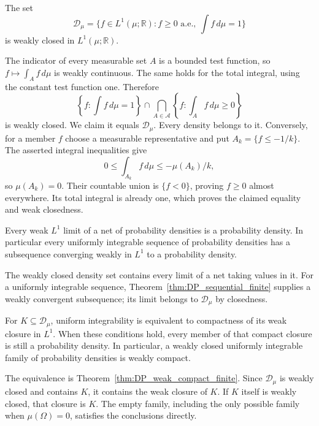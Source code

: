 \begin{proposition}
\label{prop:density_set_weak_closed}
The set
\[
\mathcal D_\mu=\{f\in L^1(\mu;\mathbb R):f\geq0\text{ a.e.},\ \int f\,d\mu=1\}
\]
is weakly closed in $L^1(\mu;\mathbb R)$.
\end{proposition}
\Proof
The indicator of every measurable set $A$ is a bounded test function,
so $f\mapsto\int_A f\,d\mu$ is weakly continuous. The same holds
for the total integral, using the constant test function one. Therefore
\[
\left\{f:\int f\,d\mu=1\right\}
 \cap\bigcap_{A\in\mathcal A}\left\{f:\int_A f\,d\mu\geq0\right\}
\]
is weakly closed. We claim it equals $\mathcal D_\mu$. Every density
belongs to it. Conversely, for a member $f$ choose a measurable
representative and put $A_k=\{f\leq-1/k\}$. The asserted integral
inequalities give
\[
0\leq\int_{A_k}f\,d\mu\leq-\mu(A_k)/k,
\]
so $\mu(A_k)=0$. Their countable union is $\{f<0\}$, proving
$f\geq0$ almost everywhere. Its total integral is already one,
which proves the claimed equality and weak closedness.
\Done

\begin{corollary}
Every weak $L^1$ limit of a net of probability densities is a
probability density. In particular every uniformly integrable sequence
of probability densities has a subsequence converging weakly in $L^1$
to a probability density.
\end{corollary}
\Proof
The weakly closed density set contains every limit of a net taking
values in it. For a uniformly integrable sequence,
Theorem~\ref{thm:DP_sequential_finite} supplies a weakly convergent
subsequence; its limit belongs to $\mathcal D_\mu$ by closedness.
\Done

\begin{corollary}
For $K\subseteq\mathcal D_\mu$, uniform integrability is equivalent
to compactness of its weak closure in $L^1$. When these conditions
hold, every member of that compact closure is still a probability
density. In particular, a weakly closed uniformly integrable family
of probability densities is weakly compact.
\end{corollary}
\Proof
The equivalence is Theorem~\ref{thm:DP_weak_compact_finite}. Since
$\mathcal D_\mu$ is weakly closed and contains $K$, it contains the
weak closure of $K$. If $K$ itself is weakly closed, that closure
is $K$. The empty family, including the only possible family when
$\mu(\Omega)=0$, satisfies the conclusions directly.
\Done

